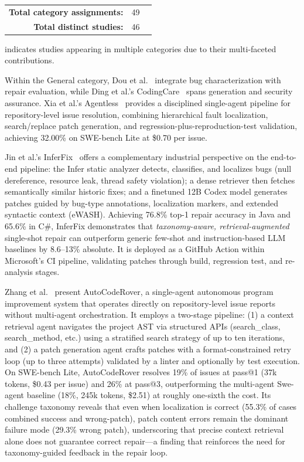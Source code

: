 \documentclass[10pt,a4paper]{article}
\begin{document}
\begin{table}[!t]
\begin{tabular}{@{}clcp{7.5cm}@{}}
\midrule
\multicolumn{2}{r}{\textbf{Total category assignments:}} & 49 & \\
\multicolumn{2}{r}{\textbf{Total distinct studies:}} & 46 & \\
\bottomrule
\end{tabular}
\begin{flushleft}
\footnotesize * indicates studies appearing in multiple categories due to their multi-faceted contributions.
\end{flushleft}
\end{table}

Within the General category, Dou et al.~\cite{dou2026} integrate bug characterization with repair evaluation, while Ding et al.'s CodingCare~\cite{ding2025codingcare} spans generation and security assurance. Xia et al.'s Agentless~\cite{xia2025agentless} provides a disciplined single-agent pipeline for repository-level issue resolution, combining hierarchical fault localization, search/replace patch generation, and regression-plus-reproduction-test validation, achieving 32.00\% on SWE-bench Lite at \$0.70 per issue.

Jin et al.'s InferFix~\cite{jin2023inferfix} offers a complementary industrial perspective on the end-to-end pipeline: the Infer static analyzer detects, classifies, and localizes bugs (null dereference, resource leak, thread safety violation); a dense retriever then fetches semantically similar historic fixes; and a finetuned 12B Codex model generates patches guided by bug-type annotations, localization markers, and extended syntactic context (eWASH). Achieving 76.8\% top-1 repair accuracy in Java and 65.6\% in C\#, InferFix demonstrates that \textit{taxonomy-aware, retrieval-augmented} single-shot repair can outperform generic few-shot and instruction-based LLM baselines by 8.6--13\% absolute. It is deployed as a GitHub Action within Microsoft's CI pipeline, validating patches through build, regression test, and re-analysis stages.

Zhang et al.~\cite{zhang2024autocoderover} present AutoCodeRover, a single-agent autonomous program improvement system that operates directly on repository-level issue reports without multi-agent orchestration. It employs a two-stage pipeline: (1) a context retrieval agent navigates the project AST via structured APIs (search\_class, search\_method, etc.) using a stratified search strategy of up to ten iterations, and (2) a patch generation agent crafts patches with a format-constrained retry loop (up to three attempts) validated by a linter and optionally by test execution. On SWE-bench Lite, AutoCodeRover resolves 19\% of issues at pass@1 (37k tokens, \$0.43 per issue) and 26\% at pass@3, outperforming the multi-agent Swe-agent baseline (18\%, 245k tokens, \$2.51) at roughly one-sixth the cost. Its challenge taxonomy reveals that even when localization is correct (55.3\% of cases combined success and wrong-patch), patch content errors remain the dominant failure mode (29.3\% wrong patch), underscoring that precise context retrieval alone does not guarantee correct repair---a finding that reinforces the need for taxonomy-guided feedback in the repair loop.
\end{document}

